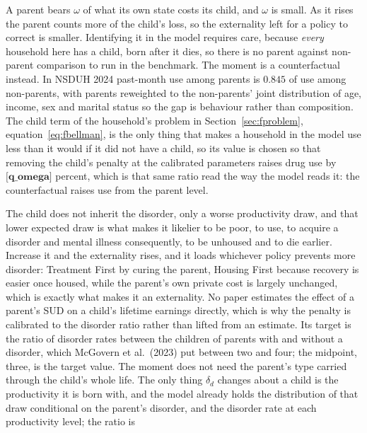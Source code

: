 \documentclass[10pt]{article}
\begin{document}
\begin{description}\setlength{\itemsep}{0.25em}\setlength{\parskip}{0em}
\item[$\omega$, the parent's weight on its child.] A parent bears $\omega$ of what
its own state costs its child, and $\omega$ is small. As it
rises the parent counts more of the child's loss, so the externality left
for a policy to correct is smaller. Identifying it in the model requires
care, because \emph{every} household here has a child, born after it dies, so there is no parent
against non-parent comparison to run in the benchmark. The moment is a
counterfactual instead. In NSDUH 2024 past-month use among parents is $0.845$ of
use among non-parents, with parents reweighted to the non-parents' joint
distribution of age, income, sex and marital status so the gap is behaviour rather
than composition. The child term of the household's problem in
Section~\ref{sec:fproblem}, equation~\eqref{eq:fbellman}, is the only
thing that makes a household in the model use less than it would if it did not
have a child, so its
value is chosen so that removing the child's penalty at the calibrated parameters
raises drug use by $\textbf{[q_omega]}$ percent, which is that same ratio read the
way the model reads it: the counterfactual raises use from the parent level.
\item[$\delta_d$, what the child loses to a parent's SUD.] The child does not inherit
the disorder, only a worse
productivity draw, and that lower expected draw is what makes it likelier to be poor, to use, to
acquire a disorder and mental illness consequently, to be unhoused and to die
earlier.
 Increase it and the externality rises, and it loads whichever policy prevents more
disorder: Treatment First by curing the parent, Housing First because recovery is
easier once housed,
while the parent's own private cost is largely unchanged, which is exactly what makes it an
externality. No paper estimates the effect of a parent's SUD on a child's lifetime
earnings directly, which is why the penalty is calibrated to the disorder ratio
rather than lifted from an estimate. Its target is the ratio of disorder rates
between the children of parents with and without a disorder, which McGovern et
al.\ (2023) put between two and four; the midpoint, three, is the target value. The
moment does not need the parent's type carried through the child's whole life. The
only thing $\delta_d$ changes about a child is the productivity it is born with,
and the model already holds the distribution of that draw conditional on the
parent's disorder, and the disorder rate at each productivity level; the ratio is

\end{description}
\end{document}
